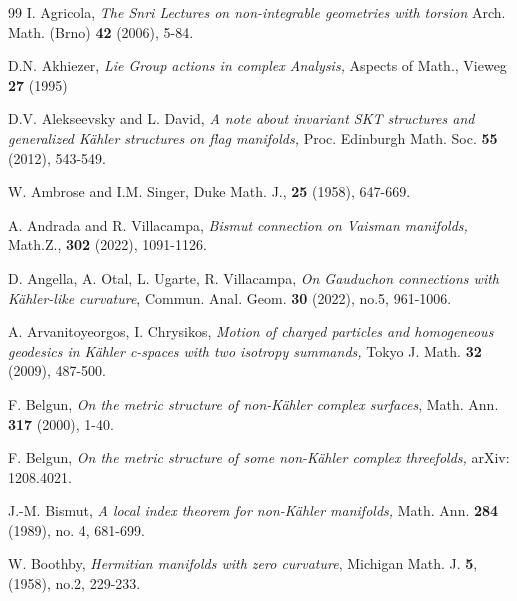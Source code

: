 \documentclass{amsart}
\numberwithin{equation}{section}
\theoremstyle{definition}
\renewcommand{\1}{\mathds{1}}
\renewcommand{\>}{\rightarrow}
\begin{document}
\begin{thebibliography}{99}
 I. Agricola,
\newblock\textit{The Snri Lectures on non-integrable geometries with torsion}
\newblock Arch. Math. (Brno) \textbf{42} (2006), 5-84.

 D.N. Akhiezer,
\newblock \textit{Lie Group actions in complex Analysis, }
\newblock  Aspects of Math., Vieweg \textbf{27} (1995)

 D.V. Alekseevsky and L. David,
\newblock \textit{ A note about invariant SKT structures and generalized K\"ahler structures on flag manifolds,}
\newblock Proc. Edinburgh Math. Soc. \textbf{55} (2012), 543-549.

 W. Ambrose and I.M. Singer,
\newblock Duke Math. J., {\bf 25} (1958), 647-669.

 A. Andrada and R. Villacampa,
\newblock \textit{Bismut connection on Vaisman manifolds,}
\newblock Math.Z., {\bf 302} (2022), 1091-1126.


 D. Angella, A. Otal, L. Ugarte, R. Villacampa,
\newblock \textit{On Gauduchon connections with K\"ahler-like curvature},
\newblock  Commun. Anal. Geom. {\bf 30} (2022), no.5, 961-1006.


 A. Arvanitoyeorgos, I. Chrysikos,
\newblock \textit{Motion of charged particles and homogeneous geodesics in K\"ahler c-spaces with two isotropy summands,}
\newblock Tokyo J. Math. {\bf 32} (2009), 487-500.

 F. Belgun,
\newblock \textit{On the metric structure of non-K\"ahler complex surfaces},
\newblock Math. Ann. \textbf{317} (2000), 1-40.


 F. Belgun,
\newblock \textit{On the metric structure of some non-K\"ahler complex threefolds,}
\newblock arXiv: 1208.4021.

 J.-M. Bismut,
\newblock\textit{A local index theorem for non-K\"ahler manifolds,}  Math. Ann. {\bf 284} (1989), no. 4, 681-699.

 W. Boothby,
\newblock \textit{Hermitian manifolds with zero curvature},
\newblock Michigan Math. J. {\bf 5}, (1958), no.2, 229-233.



\end{thebibliography}
\end{document}
